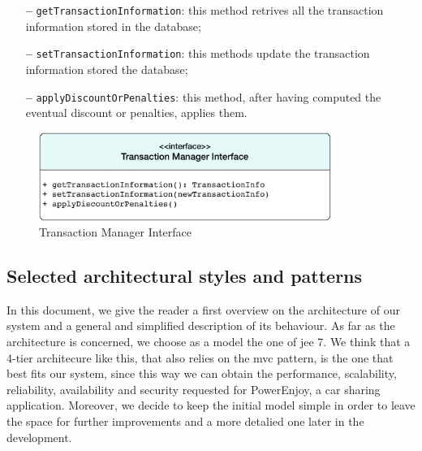 \begin{itemize}
\item[\textbf{--}] \texttt{getTransactionInformation}: this method retrives all the transaction information stored in the database;
\item[\textbf{--}] \texttt{setTransactionInformation}: this methods update the transaction information stored the database;
\item[\textbf{--}] \texttt{applyDiscountOrPenalties}: this method, after having computed the eventual discount or penalties, applies them.
\end{itemize}

\begin{figure}[htbp]
\centering
\vspace{72pt}
\includegraphics[width=0.85\textwidth]{Images/TransactionManager.pdf}
\vspace{10pt}
\caption{Transaction Manager Interface}
\label{fig:transaction}
\end{figure}
\clearpage

\subsection{Selected architectural styles and patterns} \label{arch-styles}

In this document, we give the reader a first overview on the architecture of our system and a general and simplified description of its behaviour.
As far as the architecture is concerned, we choose as a model the one of \acl{jee} 7. We think that a 4-tier architecure like this, that also relies on the \acs{mvc} pattern, is the one that best fits our system, since this way we can obtain the performance, scalability, reliability, availability and security requested for PowerEnjoy, a car sharing application.
Moreover, we decide to keep the initial model simple in order to leave the space for further improvements and a more detalied one later in the development.

